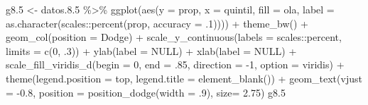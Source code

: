 \documentclass[
  12pt,
]{book}
\newenvironment{Shaded}{\begin{snugshade}}{\end{snugshade}}
\newcommand{\AttributeTok}[1]{\textcolor[rgb]{0.77,0.63,0.00}{#1}}
\newcommand{\ConstantTok}[1]{\textcolor[rgb]{0.00,0.00,0.00}{#1}}
\newcommand{\DecValTok}[1]{\textcolor[rgb]{0.00,0.00,0.81}{#1}}
\newcommand{\FloatTok}[1]{\textcolor[rgb]{0.00,0.00,0.81}{#1}}
\newcommand{\FunctionTok}[1]{\textcolor[rgb]{0.00,0.00,0.00}{#1}}
\newcommand{\NormalTok}[1]{#1}
\newcommand{\OtherTok}[1]{\textcolor[rgb]{0.56,0.35,0.01}{#1}}
\newcommand{\SpecialCharTok}[1]{\textcolor[rgb]{0.00,0.00,0.00}{#1}}
\newcommand{\StringTok}[1]{\textcolor[rgb]{0.31,0.60,0.02}{#1}}
\begin{document}
\begin{Shaded}
\begin{Highlighting}[]
\NormalTok{g8}\FloatTok{.5} \OtherTok{\textless{}{-}}\NormalTok{ datos.}\FloatTok{8.5} \SpecialCharTok{\%\textgreater{}\%} 
  \FunctionTok{ggplot}\NormalTok{(}\FunctionTok{aes}\NormalTok{(}\AttributeTok{y =}\NormalTok{ prop, }\AttributeTok{x =}\NormalTok{ quintil, }\AttributeTok{fill =}\NormalTok{ ola, }
             \AttributeTok{label =} \FunctionTok{as.character}\NormalTok{(scales}\SpecialCharTok{::}\FunctionTok{percent}\NormalTok{(prop, }\AttributeTok{accuracy =}\NormalTok{ .}\DecValTok{1}\NormalTok{)))) }\SpecialCharTok{+} 
  \FunctionTok{theme\_bw}\NormalTok{() }\SpecialCharTok{+} 
  \FunctionTok{geom\_col}\NormalTok{(}\AttributeTok{position =} \StringTok{\textquotesingle{}Dodge\textquotesingle{}}\NormalTok{) }\SpecialCharTok{+}
  \FunctionTok{scale\_y\_continuous}\NormalTok{(}\AttributeTok{labels =}\NormalTok{ scales}\SpecialCharTok{::}\NormalTok{percent,}
                     \AttributeTok{limits =} \FunctionTok{c}\NormalTok{(}\DecValTok{0}\NormalTok{, .}\DecValTok{3}\NormalTok{)) }\SpecialCharTok{+}
  \FunctionTok{ylab}\NormalTok{(}\AttributeTok{label =} \ConstantTok{NULL}\NormalTok{) }\SpecialCharTok{+}
  \FunctionTok{xlab}\NormalTok{(}\AttributeTok{label =} \ConstantTok{NULL}\NormalTok{) }\SpecialCharTok{+}
  \FunctionTok{scale\_fill\_viridis\_d}\NormalTok{(}\AttributeTok{begin =} \DecValTok{0}\NormalTok{, }\AttributeTok{end =}\NormalTok{ .}\DecValTok{85}\NormalTok{, }\AttributeTok{direction =} \SpecialCharTok{{-}}\DecValTok{1}\NormalTok{, }\AttributeTok{option =} \StringTok{\textquotesingle{}viridis\textquotesingle{}}\NormalTok{) }\SpecialCharTok{+}
  \FunctionTok{theme}\NormalTok{(}\AttributeTok{legend.position =} \StringTok{\textquotesingle{}top\textquotesingle{}}\NormalTok{,}
        \AttributeTok{legend.title =} \FunctionTok{element\_blank}\NormalTok{()) }\SpecialCharTok{+}
  \FunctionTok{geom\_text}\NormalTok{(}\AttributeTok{vjust =} \SpecialCharTok{{-}}\FloatTok{0.8}\NormalTok{,}
            \AttributeTok{position =} \FunctionTok{position\_dodge}\NormalTok{(}\AttributeTok{width =}\NormalTok{ .}\DecValTok{9}\NormalTok{),}
            \AttributeTok{size=} \FloatTok{2.75}\NormalTok{)}
\NormalTok{g8}\FloatTok{.5}
\end{Highlighting}
\end{Shaded}
\end{document}
